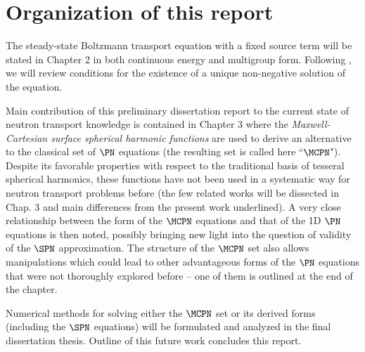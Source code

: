 \section{Organization of this report}

The steady-state Boltzmann transport equation with a fixed source term will be stated in Chapter 2 in both continuous 
energy and multigroup form. Following \cite{DautrayLions}, we will review conditions for the existence of a unique 
non-negative solution of the equation.

Main contribution of this preliminary dissertation report to the current state of neutron transport knowledge is 
contained in Chapter 3 where the \textit{Maxwell-Cartesian surface spherical harmonic functions} are used to derive an
alternative to the classical set of $\PN$ equations (the resulting set is called here ``$\MCPN$"). Despite its
favorable properties with respect to the traditional basis of tesseral spherical harmonics, these functions have not
been used in a systematic way for neutron transport problems before (the few related works will be dissected in Chap. 3
and main differences from the present work underlined). A very close relationship between the form of the $\MCPN$ 
equations and that of the 1D $\PN$ equations is then noted, possibly bringing new light into the question of validity
of the $\SPN$ approximation. The structure of the $\MCPN$ set also allows manipulations which could lead to other 
advantageous forms of the $\PN$ equations that were not thoroughly explored before -- one of them is outlined at the end
of the chapter.

Numerical methods for solving either the $\MCPN$ set or its derived forms (including the $\SPN$ equations) will be 
formulated and analyzed in the final dissertation thesis. Outline of this future work concludes this report.
